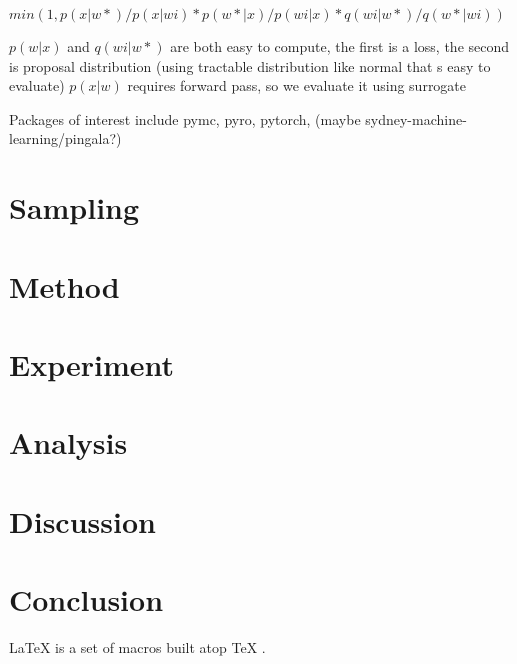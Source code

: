 \documentclass[honours,12pt]{unswthesis}
\numberwithin{equation}{section}
\begin{document}
    $min(1, p(x|w*)/p(x|wi) * p(w*|x)/p(wi|x) *  q(wi|w*)/q(w*|wi) )$

    $p(w|x)$ and $q(wi|w*)$ are both easy to compute, the first is a loss, the second is proposal distribution (using tractable distribution like normal that s easy to evaluate)    
    $p(x|w)$ requires forward pass, so we evaluate it using surrogate




\noindent Packages of interest include pymc, pyro, pytorch, (maybe  sydney-machine-learning/pingala?)



\chapter{Sampling}\label{samp}






\chapter{Method}\label{meth}




\chapter{Experiment}\label{expe}


\chapter{Analysis}\label{anal}


\chapter{Discussion}\label{disc}

\chapter{Conclusion}\label{conc}




\clearpage


\LaTeX{} \cite{latex2e} is a set of macros built atop \TeX{} \cite{texbook}.
\end{document}
